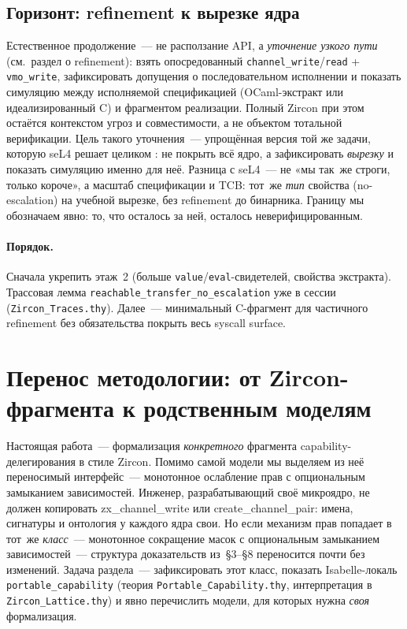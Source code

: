 \documentclass[11pt,a4paper]{article}
\newcommand{\isabel}[1]{{\isabelleit #1}}
\newcommand{\lemmaname}[1]{\isabel{#1}}
\begin{document}
\subsection{Горизонт: refinement к вырезке ядра}

Естественное продолжение~--- не расползание API, а \emph{уточнение узкого
	пути} (см.~раздел о refinement): взять опосредованный
\texttt{channel\_write}/\texttt{read} + \texttt{vmo\_write}, зафиксировать
допущения о последовательном исполнении и показать симуляцию между
исполняемой спецификацией (OCaml-экстракт или идеализированный C) и
фрагментом реализации. Полный Zircon при этом остаётся контекстом угроз и
совместимости, а не объектом тотальной верификации.
Цель такого уточнения~--- упрощённая версия той же задачи, которую
seL4 решает целиком \cite{sel4overview}: не покрыть всё ядро, а
зафиксировать \emph{вырезку} и показать симуляцию именно для неё.
Разница с seL4~--- не «мы так~же строги, только короче», а масштаб
спецификации и TCB: тот~же \emph{тип} свойства (no-escalation) на
учебной вырезке, без refinement до бинарника. Границу мы обозначаем
явно: то, что осталось за ней, осталось неверифицированным.

\paragraph{Порядок.}
Сначала укрепить этаж~2 (больше \texttt{value}/\texttt{eval}-свидетелей,
свойства экстракта). Трассовая лемма
\texttt{reachable\_transfer\_no\_escalation} уже в сессии
(\texttt{Zircon\_Traces.thy}). Далее~--- минимальный C-фрагмент для
частичного refinement без обязательства покрыть весь syscall surface.

\section{Перенос методологии: от Zircon-фрагмента к родственным моделям}
\label{sec:portability}

Настоящая работа~--- формализация \emph{конкретного} фрагмента
\textenglish{capability}-делегирования в стиле Zircon. Помимо самой
модели мы выделяем из неё переносимый интерфейс~--- монотонное
ослабление прав с опциональным замыканием зависимостей. Инженер, разрабатывающий своё микроядро, не должен
копировать \lemmaname{zx\_channel\_write} или
\lemmaname{create\_channel\_pair}: имена, сигнатуры и онтология у каждого
ядра свои. Но если механизм прав попадает в тот~же \emph{класс}~---
монотонное сокращение масок с опциональным замыканием зависимостей~---
структура доказательств из~§3--§8 переносится почти без изменений.
Задача раздела~--- зафиксировать этот класс, показать Isabelle-локаль
\texttt{portable\_capability} (теория \texttt{Portable\_Capability.thy},
интерпретация в \texttt{Zircon\_Lattice.thy}) и явно перечислить модели,
для которых нужна \emph{своя} формализация.
\end{document}
